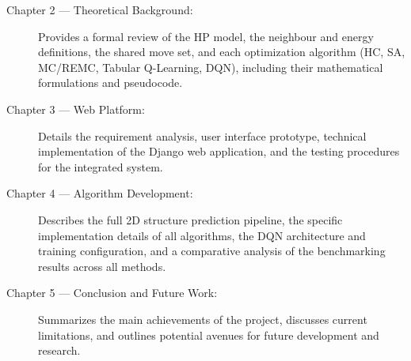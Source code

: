 \begin{description}
    \item[Chapter 2 --- Theoretical Background:] Provides a formal review of the HP model, the neighbour and energy definitions, the shared move set, and each optimization algorithm (HC, SA, MC/REMC, Tabular Q-Learning, DQN), including their mathematical formulations and pseudocode.

    \item[Chapter 3 --- Web Platform:] Details the requirement analysis, user interface prototype, technical implementation of the Django web application, and the testing procedures for the integrated system.

    \item[Chapter 4 --- Algorithm Development:] Describes the full 2D structure prediction pipeline, the specific implementation details of all algorithms, the DQN architecture and training configuration, and a comparative analysis of the benchmarking results across all methods.

    \item[Chapter 5 --- Conclusion and Future Work:] Summarizes the main achievements of the project, discusses current limitations, and outlines potential avenues for future development and research.
\end{description}
